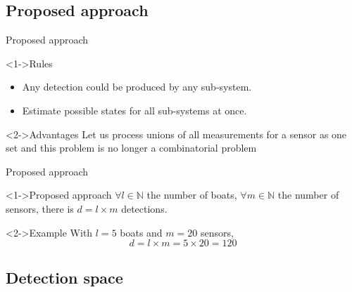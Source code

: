 \documentclass{beamer}
\begin{document}
        \subsection{Proposed approach}
            \begin{frame}{Proposed approach}
                \begin{block}<1->{\alert{Rules}}
                    \begin{itemize}
                        \item Any detection could be produced by any sub-system.
                        \item Estimate possible states for all sub-systems at once.
                    \end{itemize}
                \end{block}
                \begin{block}<2->{Advantages}
                    Let us process unions of all measurements for a sensor as one set and this problem is no longer a combinatorial problem
                \end{block}
            \end{frame}

            \begin{frame}{Proposed approach}
                \begin{block}<1->{Proposed approach}
                    $\forall l \in \mathbb{N}$ the number of boats, $\forall m \in \mathbb{N}$ the number of sensors, there is $d = l \times m$ detections.
                \end{block}
                \begin{exampleblock}<2->{Example}
                    With $l = 5$ boats and $m = 20$ sensors,
                    $$d = l \times m = 5 \times 20 = 120$$
                \end{exampleblock}
            \end{frame}

        \subsection{Detection space}
\end{document}
